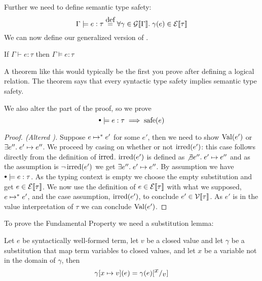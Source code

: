 Further we need to define semantic type safety:
\[
  \Gamma \models e : \tau \eqdef \forall \gamma \in \gpred{\Gamma} . \; \gamma(e) \in \epred{\tau}
\]
We can now define our generalized version of . 
\begin{btypesafety}
  If $\Gamma \vdash e : \tau$ then $\Gamma \models e : \tau$
\end{btypesafety}
A theorem like this would typically be the first you prove after defining a logical relation. The theorem says that every syntactic type safety implies semantic type safety. 

We also alter the  part of the proof, so we prove
\[
  \mtenv \models e : \tau \implies \safe(e)
\]
\begin{proof}[Proof. (Altered )]
Suppose $e \mapsto^{*} e'$ for some $e'$, then we need to show $\operatorname{Val}(e')$ or $\exists e''. \; e' \mapsto e''$. We proceed by casing on whether or not $\operatorname{irred}(e')$:
 this case follows directly from the definition of $\operatorname{irred}$. $\operatorname{irred}(e')$ is defined as $\not \exists e''. \; e' \mapsto e''$ and as the assumption is $\neg \operatorname{irred}(e')$ we get $\exists e''. \; e' \mapsto e''$.
 By assumption we have $\mtenv \models e : \tau$. As the typing context is empty we choose the empty substitution and get $e \in \mathcal{E}\llbracket \tau \rrbracket$. We now use the definition of $e \in \mathcal{E}\llbracket \tau \rrbracket$ with what we supposed, $e \mapsto^{*} e'$, and the case assumption, $\operatorname{irred}(e')$, to conclude $e' \in \mathcal{V}\llbracket \tau \rrbracket$. As $e'$ is in the value interpretation of $\tau$ we can conclude $\operatorname{Val}(e')$. 
\end{proof}
To prove the Fundamental Property we need a substitution lemma:
\begin{lemma}[Substitution]
Let $e$ be syntactically well-formed term, let $v$ be a closed value and let $\gamma$ be a substitution that map term variables to closed values, and let $x$ be a variable not in the domain of $\gamma$, then
\[
\gamma \lbrack x \mapsto v \rbrack(e) = \gamma(e)[^{\textstyle x}/_{\textstyle v}]
\]
\end{lemma}
